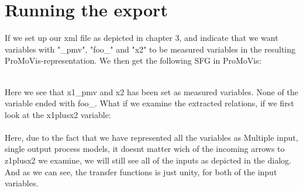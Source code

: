 \section{Running the export}
If we set up our xml file as depicted in chapter 3, and indicate that we want variables with "\_pmv", "foo\_" and "x2" to be measured variables in the resulting ProMoVis-representation. We then get the following SFG in ProMoVis:

\setlength\fboxsep{0pt}
\setlength\fboxrule{0.5pt}
\\\newline
Here we see that x1\_pmv and x2 has been set as measured variables. None of the variable ended with foo\_.
What if we examine the extracted relations, if we first look at the x1plusx2 variable:\\\newline
\setlength\fboxsep{0pt}
\setlength\fboxrule{0.5pt}
\\\newline
Here, due to the fact that we have represented all the variables as Multiple input, single output process models, it doesnt matter wich of the incoming arrows to z1plusx2 we examine, we will still see all of the inputs as depicted in the dialog. And as we can see, the transfer functions is just unity, for both of the input variables. \\\newline
